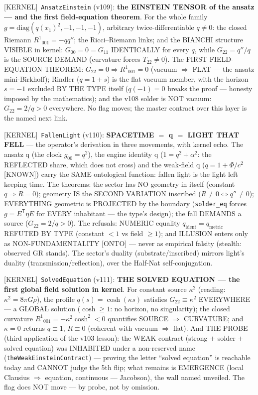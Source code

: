 \documentclass[11pt]{article}
\providecommand{\kernelmk}[1]{\textsf{[KERNEL]}~\texttt{#1}}\providecommand{\knownmk}[1]{\textsf{[KNOWN]}~{#1}}\providecommand{\statusmk}[1]{\textsf{[#1]}}
\theoremstyle{definition}\newtheorem{deriv}{Derivation}
\begin{document}
\kernelmk{AnsatzEinstein} (v109): \textbf{the EINSTEIN TENSOR of the ansatz --- and the first field-equation theorem}. For the whole family $g=\mathrm{diag}(q(x_1)^2,-1,-1,-1)$, arbitrary twice-differentiable $q\neq 0$: the closed Riemann $R^1{}_{001}=-qq''$; the Ricci--Riemann links; and the BIANCHI structure VISIBLE in kernel: $G_{00}=0=G_{11}$ IDENTICALLY for every $q$, while $G_{22}=q''/q$ is the SOURCE DEMAND (curvature forces $T_{22}\neq 0$). The FIRST FIELD-EQUATION THEOREM: $G_{22}=0\Rightarrow R^1{}_{001}=0$ (vacuum $\Rightarrow$ FLAT --- the ansatz mini-Birkhoff); Rindler ($q=1+s$) is the flat vacuum member, with the horizon $s=-1$ excluded BY THE TYPE itself ($q(-1)=0$ breaks the proof --- honesty imposed by the mathematics); and the v108 solder is NOT vacuum: $G_{22}=2/q>0$ everywhere. No flag moves; the master contract over this layer is the named next link.

\kernelmk{FallenLight} (v110): \textbf{SPACETIME $=$ q $=$ LIGHT THAT FELL} --- the operator's derivation in three movements, with kernel echo. The ansatz q (the clock $g_{00}=q^2$), the engine identity q ($1=q^2+\alpha^2$: the REFLECTED share, which does not cross) and the weak-field q ($q=1+\Phi/c^2$ [KNOWN]) carry the SAME ontological function: fallen light is the light left keeping time. The theorems: the sector has NO geometry in itself (constant $q\Rightarrow R=0$); geometry IS the SECOND VARIATION inscribed ($R\neq 0\Leftrightarrow q''\neq 0$); EVERYTHING geometric is PROJECTED by the boundary (\texttt{solder\_eq} forces $g=E^{\mathsf{T}}\eta E$ for EVERY inhabitant --- the type's design); the fall DEMANDS a source ($G_{22}=2/q>0$). The refusals: NUMERIC equality $q_{\mathrm{ident}}=q_{\mathrm{metric}}$ REFUTED BY TYPE (constant $<1$ vs field $\ge 1$); and ILLUSION enters only as NON-FUNDAMENTALITY [ONTO] --- never as empirical falsity (stealth: observed GR stands). The sector's duality (substrate/inscribed) mirrors light's duality (transmission/reflection), over the Half-Nat self-conjugation.

\kernelmk{SolvedEquation} (v111): \textbf{THE SOLVED EQUATION --- the first global field solution in kernel}. For constant source $\kappa^2$ (reading: $\kappa^2=8\pi G\rho$), the profile $q(s)=\cosh(\kappa s)$ satisfies $G_{22}\equiv\kappa^2$ EVERYWHERE --- a GLOBAL solution ($\cosh\ge 1$: no horizon, no singularity); the closed curvature $R^1{}_{001}=-\kappa^2\cosh^2<0$ quantifies SOURCE $\Rightarrow$ CURVATURE; and $\kappa=0$ returns $q\equiv 1$, $R\equiv 0$ (coherent with vacuum $\Rightarrow$ flat). And THE PROBE (third application of the v103 lesson): the WEAK contract (strong $+$ solder $+$ solved equation) was INHABITED under a non-reserved name (\texttt{theWeakEinsteinContract}) --- proving the letter ``solved equation'' is reachable today and CANNOT judge the 5th flip; what remains is EMERGENCE (local Clausius $\Rightarrow$ equation, continuous --- Jacobson), the wall named unveiled. The flag does NOT move --- by probe, not by omission.
\end{document}
